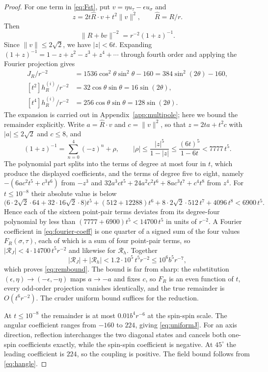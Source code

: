\documentclass[12pt,a4paper]{article}
\newcommand{\abs}[1]{\lvert #1\rvert}
\newcommand{\norm}[1]{\lVert #1\rVert}
\begin{document}
\begin{proof}
For one term in \eqref{eq:Fst}, put $v=\eta u_\tau-\epsilon u_\sigma$ and
\[
 z=2t\widehat R\cdot v+t^2\norm v^2,
 \qquad \widehat R=R/r.
\]
Then
\[
 \norm{R+bv}^{-2}=r^{-2}(1+z)^{-1}.
\]
Since $\norm v\le2\sqrt2$, we have $|z|<6t$.  Expanding $(1+z)^{-1}=1-z+z^2-z^3+z^4+\cdots$ through fourth order and applying the Fourier projection gives
\begin{align*}
 [t^4]J_R/r^{-2}
 &=1536\cos^2\theta\sin^2\theta-160
 =384\sin^2(2\theta)-160,\\
 [t^2]h_R^{(i)}/r^{-2}
 &=32\cos\theta\sin\theta=16\sin(2\theta),\\
 [t^4]h_R^{(i)}/r^{-2}
 &=256\cos\theta\sin\theta=128\sin(2\theta).
\end{align*}
The expansion is carried out in Appendix~\ref{app:multipole}; here we bound the remainder explicitly.  Write $a=\widehat R\cdot v$ and $c=\norm v^2$, so that $z=2ta+t^2c$ with $\abs a\le2\sqrt2$ and $c\le8$, and
\[
 (1+z)^{-1}=\sum_{n=0}^{4}(-z)^n+\rho,
 \qquad
 \abs\rho\le\frac{\abs z^5}{1-\abs z}\le\frac{(6t)^5}{1-6t}<7777\,t^5 .
\]
The polynomial part splits into the terms of degree at most four in $t$, which produce the displayed coefficients, and the terms of degree five to eight, namely $-(6ac^2t^5+c^3t^6)$ from $-z^3$ and $32a^3ct^5+24a^2c^2t^6+8ac^3t^7+c^4t^8$ from $z^4$.  For $t\le10^{-8}$ their absolute value is below
\[
 \bigl(6\cdot2\sqrt2\cdot64+32\cdot16\sqrt2\cdot8\bigr)t^5+(512+12288)t^6+8\cdot2\sqrt2\cdot512\,t^7+4096\,t^8<6900\,t^5 .
\]
Hence each of the sixteen point-pair terms deviates from its degree-four polynomial by less than $(7777+6900)t^5<14700\,t^5$ in units of $r^{-2}$.  A Fourier coefficient in \eqref{eq:fourier-coeff} is one quarter of a signed sum of the four values $F_R(\sigma,\tau)$, each of which is a sum of four point-pair terms, so $\abs{\mathcal R_J}<4\cdot14700\,t^5r^{-2}$ and likewise for $\mathcal R_h$.  Together
\[
 \abs{\mathcal R_J}+\abs{\mathcal R_h}<1.2\cdot10^5\,t^5r^{-2}\le10^6b^5r^{-7},
\]
which proves \eqref{eq:rembound}.  The bound is far from sharp: the substitution $(\epsilon,\eta)\to(-\epsilon,-\eta)$ maps $a\to-a$ and fixes $c$, so $F_R$ is an even function of $t$, every odd-order projection vanishes identically, and the true remainder is $O(t^6r^{-2})$.  The cruder uniform bound suffices for the reduction.

At $t\le10^{-8}$ the remainder is at most $0.01b^4r^{-6}$ at the spin-spin scale.  The angular coefficient ranges from $-160$ to $224$, giving \eqref{eq:uniformJ}.  For an axis direction, reflection interchanges the two diagonal states and cancels both one-spin coefficients exactly, while the spin-spin coefficient is negative.  At $45^\circ$ the leading coefficient is $224$, so the coupling is positive.  The field bound follows from \eqref{eq:hangle}.
\end{proof}
\end{document}
